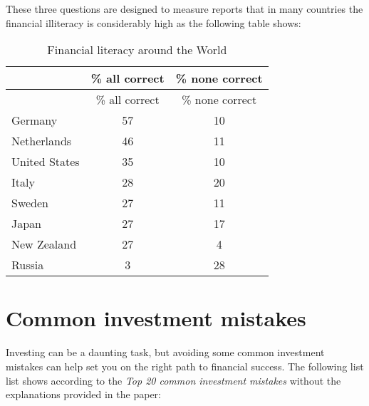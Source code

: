 {	These three questions are designed to measure
	\citet{Lusardi2014Economic} reports that in many countries the financial illiteracy is considerably high as the following table shows:
	
	\begin{longtable}[]{@{}lcc@{}}
		\caption{Financial literacy around the World}\tabularnewline
		\toprule\noalign{}
		& \% all correct & \% none correct \\
		\midrule\noalign{}
		\endfirsthead
		\toprule\noalign{}
		& \% all correct & \% none correct \\
		\midrule\noalign{}
		\endhead
		\bottomrule\noalign{}
		\endlastfoot
		Germany & 57 & 10 \\
		Netherlands & 46 & 11 \\
		United States & 35 & 10 \\
		Italy & 28 & 20 \\
		Sweden & 27 & 11 \\
		Japan & 27 & 17 \\
		New Zealand & 27 & 4 \\
		Russia & 3 & 28 \\
	\end{longtable}
	
}

\section{Common investment mistakes}\label{common-investment-mistakes}

Investing can be a daunting task, but avoiding some common investment mistakes can help set you on the right path to financial success.
The following list list shows according to \citet{Stammers2016Tips} the \emph{Top 20 common investment mistakes} without the explanations provided in the paper:

